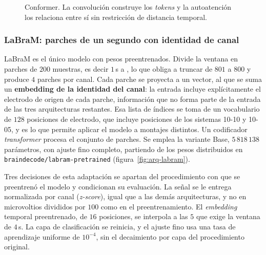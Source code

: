 \begin{figure}[H]
\centering
{}
\caption{Conformer. La convolución construye los \emph{tokens} y la autoatención los
relaciona entre sí sin restricción de distancia temporal.}
\label{fig:arq-conformer}
\end{figure}

\subsubsection{LaBraM: parches de un segundo con identidad de canal}

LaBraM \cite{jiang2024labram} es el único modelo con pesos preentrenados. Divide la ventana
en parches de $200$ muestras,
es decir $1$\,s a , lo que obliga a truncar de $801$ a $800$ y produce $4$ parches
por canal. Cada parche se proyecta a un vector, al que se suma un \textbf{embedding de la
identidad del canal}: la entrada incluye explícitamente el electrodo de origen
de cada parche, información que no forma parte de la entrada de las tres arquitecturas restantes. Esa lista
de índices se toma de un vocabulario de $128$ posiciones de electrodo, que incluye
posiciones de los sistemas 10-10 y 10-05, y es lo que permite aplicar el
modelo a montajes distintos. Un codificador \emph{transformer} procesa el conjunto de
parches. Se emplea la variante Base, $5\,818\,138$ parámetros, con ajuste fino completo,
partiendo de los pesos distribuidos en \texttt{braindecode/labram-pretrained}
(figura~\ref{fig:arq-labram}).

Tres decisiones de esta adaptación se apartan del procedimiento con que se preentrenó el
modelo y condicionan su evaluación. La señal se le entrega normalizada por canal
(\textit{z-score}), igual que a las demás arquitecturas, y no en microvoltios divididos por
$100$ como en el preentrenamiento. El \emph{embedding} temporal preentrenado, de $16$
posiciones, se interpola a las $5$ que exige la ventana de $4$\,s. La capa de clasificación
se reinicia, y el ajuste fino usa una tasa de aprendizaje uniforme de $10^{-4}$, sin el
decaimiento por capa del procedimiento original.

